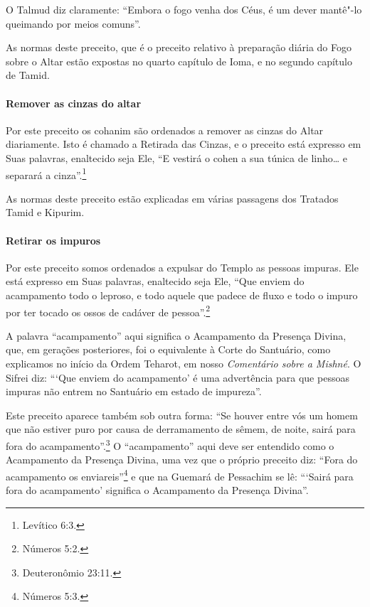 \begin{multicols}{2}
O Talmud\starr{} diz claramente: ``Embora o fogo venha dos Céus, é um dever
mantê"-lo queimando por meios comuns''.

As normas deste preceito, que é o preceito relativo à preparação diária
do Fogo sobre o Altar estão expostas no quarto capítulo de Ioma\starr, e no
segundo capítulo de Tamid\starr.

\paragraph{Remover as cinzas do altar}

Por este preceito os cohanim\starr{} são ordenados a remover as cinzas do
Altar diariamente. Isto é chamado a Retirada das Cinzas, e o preceito
está expresso em Suas palavras, enaltecido seja Ele, ``E vestirá o
cohen\starr{} a sua túnica de linho\ldots{} e separará a cinza''.\footnote{Levítico 6:3.}

As normas deste preceito estão explicadas em várias passagens dos
Tratados Tamid\starr{} e Kipurim\starr.

\paragraph{Retirar os impuros}

Por este preceito somos ordenados a expulsar do Templo as pessoas
impuras. Ele está expresso em Suas palavras, enaltecido seja Ele, ``Que
enviem do acampamento todo o leproso, e todo aquele que padece de fluxo
e todo o impuro por ter tocado os ossos de cadáver de pessoa''.\footnote{Números
5:2.}

A palavra ``acampamento'' aqui significa o Acampamento da Presença
Divina, que, em gerações posteriores, foi o equivalente à Corte do
Santuário, como explicamos no início da Ordem Teharot\starr, em nosso
\emph{Comentário sobre a Mishné}. O Sifrei\starr{} diz: ```Que enviem do acampamento'
é uma advertência para que pessoas impuras não entrem no Santuário em
estado de impureza''.

Este preceito aparece também sob outra forma: ``Se houver entre vós
um homem que não estiver puro por causa de derramamento de sêmem, de
noite, sairá para fora do acampamento''.\footnote{Deuteronômio 23:11.} O
``acampamento'' aqui deve ser entendido como o Acampamento da Presença
Divina, uma vez que o próprio preceito diz: ``Fora do acampamento os
enviareis''\footnote{Números 5:3.} e que na Guemará\starr{} de Pessachim\starr{} se lê: ```Sairá
para fora do acampamento' significa o Acampamento da Presença Divina''.


\end{multicols}
